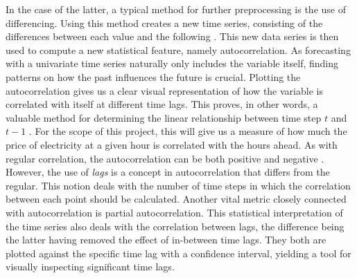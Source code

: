 \documentclass
[twocolumn,
secnumarabic,
nobibnotes,
aps,
prl,
reprint,
groupedaddress,
amsmath,
amssymb,
]{revtex4-2}
\begin{document}
In the case of the latter, a typical method for further preprocessing is the use of differencing. Using this method creates a new time series, consisting of the differences between each value and the following \cite{Korstanje2021}. This new data series is then used to compute a new statistical feature, namely autocorrelation. As forecasting with a univariate time series naturally only includes the variable itself, finding patterns on how the past influences the future is crucial. Plotting the autocorrelation gives us a clear visual representation of how the variable is correlated with itself at different time lags. This proves, in other words, a valuable method for determining the linear relationship between time step $t$ and $t-1$ \cite{Vishwas2020}. For the scope of this project, this will give us a measure of how much the price of electricity at a given hour is correlated with the hours ahead. As with regular correlation, the autocorrelation can be both positive and negative \cite{Korstanje2021}. However, the use of \emph{lags} is a concept in autocorrelation that differs from the regular. This notion deals with the number of time steps in which the correlation between each point should be calculated. 
Another vital metric closely connected with autocorrelation is partial autocorrelation. This statistical interpretation of the time series also deals with the correlation between lags, the difference being the latter having removed the effect of in-between time lags\cite{Vishwas2020}. They both are plotted against the specific time lag with a confidence interval, yielding a tool for visually inspecting significant time lags. 
\end{document}
